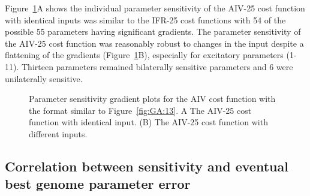 Figure~\ref{fig:GA:15}A shows the individual parameter sensitivity of the
AIV-25 cost function with identical inputs was similar to the IFR-25 cost
functions with 54 of the possible 55 parameters having significant
gradients.  The parameter sensitivity of the AIV-25 cost function was
reasonably robust to changes in the {\ANF} input despite a flattening of the
gradients (Figure~\ref{fig:GA:15}B), especially for excitatory parameters
(1-11). Thirteen parameters remained bilaterally sensitive parameters and 6
were unilaterally sensitive.  %


\begin{figure}[ht]
  \centering
  \caption{Parameter sensitivity gradient plots for the AIV cost
    function with the format similar to Figure~\ref{fig:GA:13}. A The
    AIV-25 cost function with identical input. (B) The AIV-25 cost
    function with different {\ANF} inputs.%
}
  \label{fig:GA:15}
\end{figure}




\subsection{Correlation between sensitivity and eventual best genome parameter error}\label{sec:GA:corr-betw-sens}





